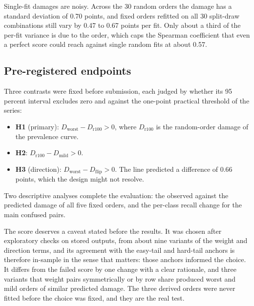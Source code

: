 \documentclass[11pt]{article}
\begin{document}
Single-fit damages are noisy. Across the 30 random orders the damage has a standard deviation of 0.70 points, and fixed orders refitted on all 30 split-draw combinations still vary by 0.47 to 0.67 points per fit. Only about a third of the per-fit variance is due to the order, which caps the Spearman coefficient that even a perfect score could reach against single random fits at about 0.57.

\subsection{Pre-registered endpoints}
\label{sec:endpoints}
Three contrasts were fixed before submission, each judged by whether its 95 percent interval excludes zero and against the one-point practical threshold of the series:
\begin{itemize}
  \item \textbf{H1} (primary): $D_{\text{worst}} - D_{\text{r100}} > 0$, where $D_{\text{r100}}$ is the random-order damage of the prevalence curve.
  \item \textbf{H2}: $D_{\text{r100}} - D_{\text{mild}} > 0$.
  \item \textbf{H3} (direction): $D_{\text{worst}} - D_{\text{flip}} > 0$. The line predicted a difference of 0.66 points, which the design might not resolve.
\end{itemize}
\noindent Two descriptive analyses complete the evaluation: the observed against the predicted damage of all five fixed orders, and the per-class recall change for the main confused pairs.

The score deserves a caveat stated before the results. It was chosen after exploratory checks on stored outputs, from about nine variants of the weight and direction terms, and its agreement with the easy-tail and hard-tail anchors is therefore in-sample in the sense that matters: those anchors informed the choice. It differs from the failed score by one change with a clear rationale, and three variants that weight pairs symmetrically or by row share produced worst and mild orders of similar predicted damage. The three derived orders were never fitted before the choice was fixed, and they are the real test.





\end{document}
